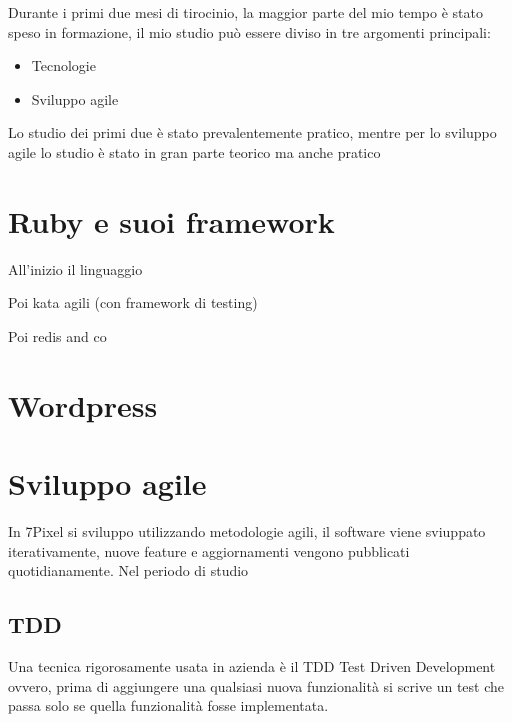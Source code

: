 


Durante i primi due mesi di tirocinio, la maggior parte del mio tempo è stato speso in formazione,
il mio studio può essere diviso in tre argomenti principali:

\begin{itemize}
\item Tecnologie
\item Sviluppo agile
\end{itemize}

Lo studio dei primi due è stato prevalentemente pratico, mentre per lo sviluppo
agile lo studio è stato in gran parte teorico ma anche pratico

\section{Ruby e suoi framework}

All'inizio il linguaggio

Poi kata agili (con framework di testing)

Poi redis and co


\section{Wordpress}



\section{Sviluppo agile}

In 7Pixel si sviluppo utilizzando metodologie agili, il software viene sviuppato
iterativamente, nuove feature e aggiornamenti vengono pubblicati quotidianamente.
Nel periodo di studio 

\subsection{TDD}
Una tecnica rigorosamente usata in azienda è il TDD Test Driven Development ovvero, prima di
aggiungere una qualsiasi nuova funzionalità si scrive un test che passa solo se 
quella funzionalità fosse implementata. 

